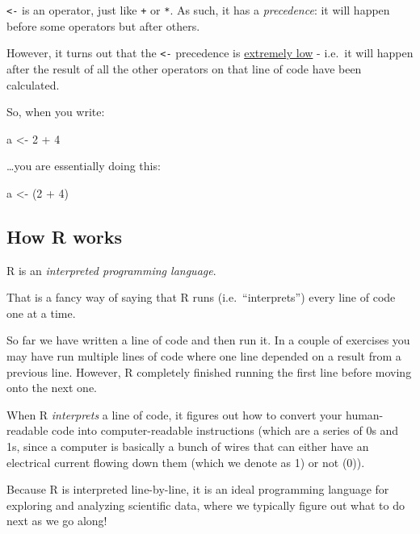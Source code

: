 \documentclass[
]{article}
\newenvironment{Shaded}{\begin{snugshade}}{\end{snugshade}}
\newcommand{\DecValTok}[1]{\textcolor[rgb]{0.00,0.00,0.81}{#1}}
\newcommand{\NormalTok}[1]{#1}
\newcommand{\OtherTok}[1]{\textcolor[rgb]{0.56,0.35,0.01}{#1}}
\newcommand{\SpecialCharTok}[1]{\textcolor[rgb]{0.00,0.00,0.00}{#1}}
\theoremstyle{definition}
\theoremstyle{definition}
\theoremstyle{definition}
\theoremstyle{definition}
\theoremstyle{remark}
\begin{document}
\texttt{\textless{}-} is an operator, just like \texttt{+} or \texttt{*}. As such, it has a \emph{precedence}: it will happen before some operators but after others.

However, it turns out that the \texttt{\textless{}-} precedence is \href{https://stat.ethz.ch/R-manual/R-devel/library/base/html/Syntax.html}{extremely low} - i.e.~it will happen after the result of all the other operators on that line of code have been calculated.

So, when you write:

\begin{Shaded}
\begin{Highlighting}[]
\NormalTok{a }\OtherTok{\textless{}{-}} \DecValTok{2} \SpecialCharTok{+} \DecValTok{4}
\end{Highlighting}
\end{Shaded}

\ldots you are essentially doing this:

\begin{Shaded}
\begin{Highlighting}[]
\NormalTok{a }\OtherTok{\textless{}{-}}\NormalTok{ (}\DecValTok{2} \SpecialCharTok{+} \DecValTok{4}\NormalTok{)}
\end{Highlighting}
\end{Shaded}

\hypertarget{how-r-works}{%
\subsection{How R works}\label{how-r-works}}

R is an \emph{interpreted programming language}.

That is a fancy way of saying that R runs (i.e.~``interprets'') every line of code one at a time.

So far we have written a line of code and then run it. In a couple of exercises you may have run multiple lines of code where one line depended on a result from a previous line. However, R completely finished running the first line before moving onto the next one.

When R \emph{interprets} a line of code, it figures out how to convert your human-readable code into computer-readable instructions (which are a series of 0s and 1s, since a computer is basically a bunch of wires that can either have an electrical current flowing down them (which we denote as 1) or not (0)).

Because R is interpreted line-by-line, it is an ideal programming language for exploring and analyzing scientific data, where we typically figure out what to do next as we go along!
\end{document}
